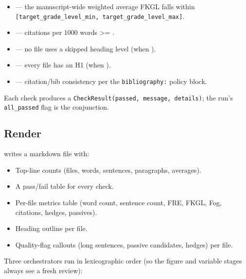 \documentclass[
]{article}
\providecommand{\tightlist}{%
  \setlength{\itemsep}{0pt}\setlength{\parskip}{0pt}}
\begin{document}
\begin{itemize}
\tightlist
\item
   --- the manuscript-wide weighted
  average FKGL falls within
  \texttt{{[}target\_grade\_level\_min,\ target\_grade\_level\_max{]}}.
\item
   --- citations per 1000 words \texorpdfstring{\textgreater{}=}{>=}
  .
\item
   --- no file uses a skipped
  heading level (when ).
\item
   --- every file has an H1 (when
  ).
\item
   --- citation/bib consistency per the
  \texttt{bibliography:} policy block.
\end{itemize}

Each check produces a \texttt{CheckResult(passed,\ message,\ details)};
the run's \texttt{all\_passed} flag is the conjunction.

\subsection{Render}\label{render}

 writes a markdown file
with:

\begin{itemize}
\tightlist
\item
  Top-line counts (files, words, sentences, paragraphs, averages).
\item
  A pass/fail table for every check.
\item
  Per-file metrics table (word count, sentence count, FRE, FKGL, Fog,
  citations, hedges, passives).
\item
  Heading outline per file.
\item
  Quality-flag callouts (long sentences, passive candidates, hedges) per
  file.
\end{itemize}

Three orchestrators run in lexicographic order (so the figure and
variable stages always see a fresh review):
\end{document}
